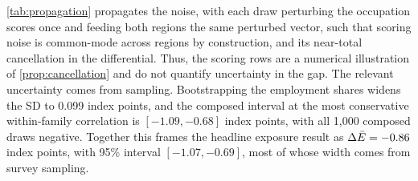 \cref{tab:propagation} propagates the noise, with each draw perturbing the occupation scores once and feeding both regions the same perturbed vector, such that scoring noise is common-mode across regions by construction, and its near-total cancellation in the differential. Thus, the scoring rows are a numerical illustration of \cref{prop:cancellation} and do not quantify uncertainty in the gap. The relevant uncertainty comes from sampling. Bootstrapping the employment shares widens the SD to 0.099 index points, and the composed interval at the most conservative within-family correlation is $[-1.09, -0.68]$ index points, with all 1,000 composed draws negative. Together this frames the headline exposure result as $\Delta\bar{E} = -0.86$ index points, with 95\% interval $[-1.07, -0.69]$, most of whose width comes from survey sampling. 

 
 

